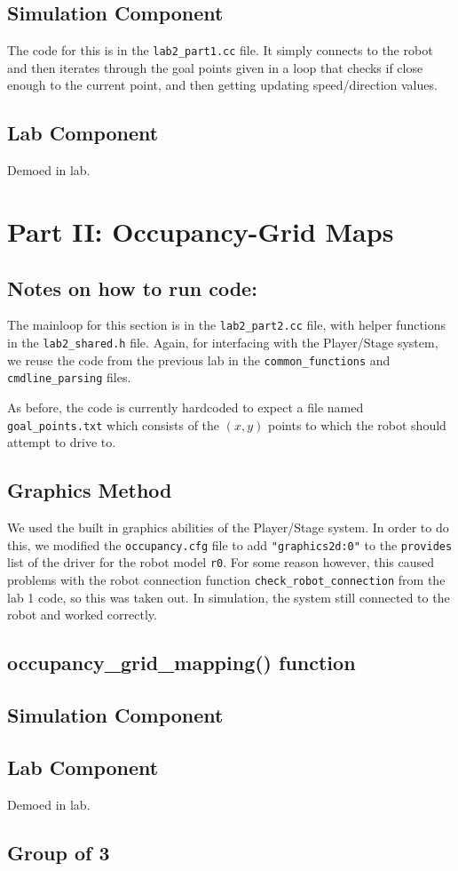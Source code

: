 \documentclass[10pt, titlepage, onecolumn, fleqn]{article}
\begin{document}
\subsection{Simulation Component}

The code for this is in the \verb|lab2_part1.cc| file. It simply connects to the robot and then iterates through the goal points given in a loop that checks if close enough to the current point, and then getting updating speed/direction values.

\subsection{Lab Component}

Demoed in lab.

\section{Part II: Occupancy-Grid Maps}

\subsection*{Notes on how to run code:}

The mainloop for this section is in the \verb|lab2_part2.cc| file, with helper functions in the \verb|lab2_shared.h| file. Again, for interfacing with the Player/Stage system, we reuse the code from the previous lab in the \verb|common_functions| and \verb|cmdline_parsing| files.

As before, the code is currently hardcoded to expect a file named \verb|goal_points.txt| which consists of the $(x,y)$ points to which the robot should attempt to drive to.

\subsection*{Graphics Method}

We used the built in graphics abilities of the Player/Stage system. In order to do this, we modified the \verb|occupancy.cfg| file to add \verb|"graphics2d:0"| to the \verb|provides| list of the driver for the robot model \verb|r0|. For some reason however, this caused problems with the robot connection function \verb|check_robot_connection| from the lab 1 code, so this was taken out. In simulation, the system still connected to the robot and worked correctly.

\subsection{occupancy\_grid\_mapping() function}



\subsection{Simulation Component}



\subsection{Lab Component}

Demoed in lab.

\subsection{Group of 3}
\end{document}
